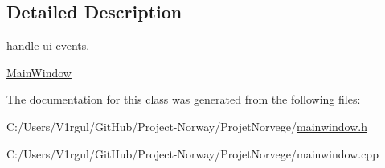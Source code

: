 \subsection{Detailed Description}
handle ui events. 

\hyperlink{class_main_window}{Main\-Window} 

The documentation for this class was generated from the following files\-:\begin{DoxyCompactItemize}
\item 
C\-:/\-Users/\-V1rgul/\-Git\-Hub/\-Project-\/\-Norway/\-Projet\-Norvege/\hyperlink{mainwindow_8h}{mainwindow.\-h}\item 
C\-:/\-Users/\-V1rgul/\-Git\-Hub/\-Project-\/\-Norway/\-Projet\-Norvege/mainwindow.\-cpp\end{DoxyCompactItemize}

